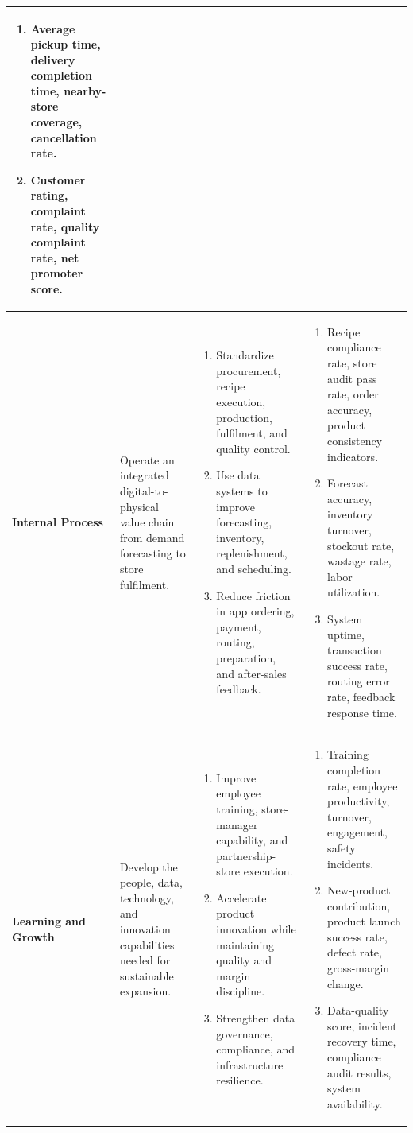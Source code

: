 \documentclass[12pt,a4paper]{article}
\begin{document}
\begin{landscape}
\begin{table}[H]
\begin{tabularx}{\linewidth}{P{2.8cm}P{5.1cm}P{8.0cm}Y}
\begin{enumerate}[leftmargin=*,nosep]
  \item Average pickup time, delivery completion time, nearby-store coverage, cancellation rate.
  \item Customer rating, complaint rate, quality complaint rate, net promoter score.
\end{enumerate} \\
\midrule
\textbf{Internal Process} &
Operate an integrated digital-to-physical value chain from demand forecasting to store fulfilment. &
\begin{enumerate}[leftmargin=*,nosep]
  \item Standardize procurement, recipe execution, production, fulfilment, and quality control.
  \item Use data systems to improve forecasting, inventory, replenishment, and scheduling.
  \item Reduce friction in app ordering, payment, routing, preparation, and after-sales feedback.
\end{enumerate} &
\begin{enumerate}[leftmargin=*,nosep]
  \item Recipe compliance rate, store audit pass rate, order accuracy, product consistency indicators.
  \item Forecast accuracy, inventory turnover, stockout rate, wastage rate, labor utilization.
  \item System uptime, transaction success rate, routing error rate, feedback response time.
\end{enumerate} \\
\midrule
\textbf{Learning and Growth} &
Develop the people, data, technology, and innovation capabilities needed for sustainable expansion. &
\begin{enumerate}[leftmargin=*,nosep]
  \item Improve employee training, store-manager capability, and partnership-store execution.
  \item Accelerate product innovation while maintaining quality and margin discipline.
  \item Strengthen data governance, compliance, and infrastructure resilience.
\end{enumerate} &
\begin{enumerate}[leftmargin=*,nosep]
  \item Training completion rate, employee productivity, turnover, engagement, safety incidents.
  \item New-product contribution, product launch success rate, defect rate, gross-margin change.
  \item Data-quality score, incident recovery time, compliance audit results, system availability.
\end{enumerate} \\
\bottomrule
\end{tabularx}
\end{table}
\end{landscape}
\end{document}
